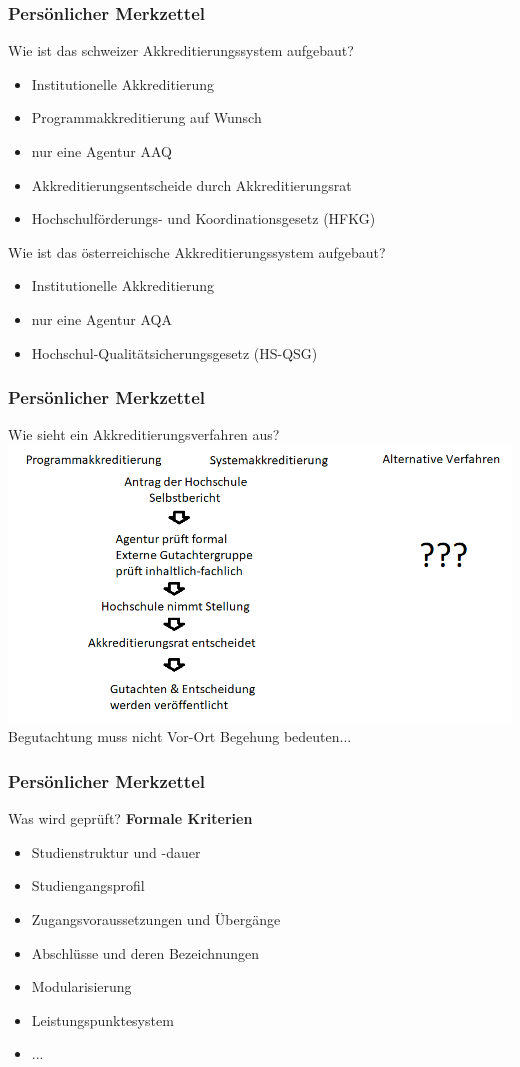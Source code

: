 \documentclass{beamer}
\begin{document}
\begin{frame}
\frametitle{Persönlicher Merkzettel}
Wie ist das schweizer Akkreditierungssystem aufgebaut?
\begin{itemize}
\item Institutionelle Akkreditierung
\item Programmakkreditierung auf Wunsch
\item nur eine Agentur AAQ
\item Akkreditierungsentscheide durch Akkreditierungsrat
\item Hochschulförderungs- und Koordinationsgesetz (HFKG)
\end{itemize}
\pause
Wie ist das österreichische Akkreditierungssystem aufgebaut?
\begin{itemize}
\item Institutionelle Akkreditierung
\item nur eine Agentur AQA
\item Hochschul-Qualitätsicherungsgesetz (HS-QSG)
\end{itemize}
\end{frame}
\begin{frame}
\frametitle{Persönlicher Merkzettel}
Wie sieht ein Akkreditierungsverfahren aus?
\vspace{0.5cm}
  \includegraphics[width=1\textwidth]{verfahren.png}\\
Begutachtung muss nicht Vor-Ort Begehung bedeuten...
\end{frame}
\begin{frame}
\frametitle{Persönlicher Merkzettel}
Was wird geprüft?
\vspace{0.5cm}
\textbf{Formale Kriterien}
\begin{itemize}
\item Studienstruktur und -dauer
\item Studiengangsprofil
\item Zugangsvoraussetzungen und Übergänge
\item Abschlüsse und deren Bezeichnungen
\item Modularisierung
\item Leistungspunktesystem
\item ...
\end{itemize}
\end{frame}
\end{document}
